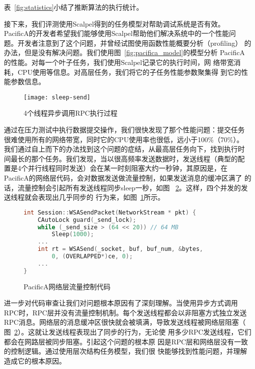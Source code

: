 表~\ref{fig:statistics}小结了推断算法的执行统计。

接下来，我们评测使用Scalpel得到的任务模型对帮助调试系统是否有效。
PacificA的开发者希望我们能够使用Scalpel帮助他们解决系统中的一个性能问
题。开发者注意到了这个问题，并曾经试图使用函数性能概要分析（profiling）
的办法，但是没有解决问题。我们使用图~\ref{fig:pacifica_model}的模型分析
PacificA的性能。对每一个叶子任务，我们使用Scalpel记录它的执行时间，网
络带宽消耗，CPU使用等信息。对高层任务，我们将它的子任务性能参数聚集得
到它的性能参数信息。

\begin{figure}
  \centering
  \begin{minipage}{0.8\linewidth}
    \centering
    \texttt{[image: sleep-send]}
    \caption{4个线程异步调用RPC执行过程}
    \label{fig:sleep-send}
  \end{minipage}
\end{figure}


通过在压力测试中执行数据提交操作，我们很快发现了那个性能问题：提交任务
很难使用所有的网络带宽，同时它的CPU使用率也很低，远小于100\%（70\%）。
我们通过自上而下的办法找到这个问题的症结，从最高层任务向下，找到执行时
间最长的那个任务。我们发现，当以很高频率发送数据时，发送线程（典型的配
置是4个并行线程同时发送）会在某一时刻阻塞大约一秒钟，其原因是，在
PacificA的网络层代码，会对数据发送做流量控制，如果发送消息的缓冲区满了
的话，流量控制会引起所有发送线程同步sleep一秒，如图~
\ref{fig:flow_control_code}。这样，四个并发的发送线程就会表现出几乎同步的
行为来，如图~\ref{fig:sleep-send}所示。

\begin{figure}
\centering
\begin{lstlisting}[language=C++]
int Session::WSASendPacket(NetworkStream * pkt) {    
    CAutoLock guard(_send_lock);
    while (_send_size > (64 << 20)) // 64 MB
        Sleep(1000);
    ...
    int rt = WSASend(_socket, buf, buf_num, &bytes,
        0, (OVERLAPPED*)ce, 0);
    ...
}
\end{lstlisting}
\caption{PacificA网络层流量控制代码}
\label{fig:flow_control_code}
\end{figure}


进一步对代码审查让我们对问题根本原因有了深刻理解。当使用异步方式调用
RPC时，RPC层并没有流量控制机制。每个发送线程都会以非阻塞方式独立发送
RPC消息。网络层的消息缓冲区很快就会被填满，导致发送线程被网络层阻塞（
图~\ref{fig:flow_control_code}）。这就让发送线程表现出了同步的行为，无论使
用多少RPC发送线程，它们都会在网路层被同步阻塞。引起这个问题的根本原
因是RPC层和网络层没有一致的控制逻辑。通过使用层次结构任务模型，我们很
快能够找到性能问题，并理解造成它的根本原因。

